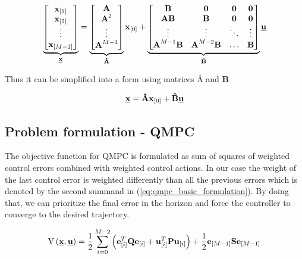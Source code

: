 \begin{equation}
\label{eq:prediction_big}
\underbrace{
\begin{bmatrix}
\textbf{x}_{[1]} \\
\textbf{x}_{[2]} \\
\vdots \\
\textbf{x}_{[M-1]} \\
\end{bmatrix}}_{\textbf{\underline{x}}}
=
\underbrace{
\begin{bmatrix}
\textbf{A} \\
\textbf{A}^2 \\
\vdots \\
\textbf{A}^{M-1} \\
\end{bmatrix}}_{\textbf{\^A}}
\textbf{x}_{[0]}
+
\underbrace{
\begin{bmatrix}
\textbf{B} & \textbf{0} & \textbf{0} & \textbf{0} \\
\textbf{AB} & \textbf{B} & \textbf{0} & \textbf{0} \\
\vdots & \vdots & \ddots & \vdots \\
\textbf{A}^{M-1}\textbf{B} & \textbf{A}^{M-2}\textbf{B} & \hdots & \textbf{B}
\end{bmatrix}
}_{\textbf{\^B}}\underline{\textbf{u}}
\end{equation}

Thus it can be simplified into a form using matrices $\textbf{\^A}$ and $\textbf{\^B}$

\begin{equation}
\textbf{\underline{x}} = \textbf{\^A}\textbf{x}_{[0]} + \textbf{\^B}\textbf{\underline{u}}
\label{eq:prediction_final}
\end{equation}

\subsection{Problem formulation - QMPC}


The objective function for QMPC is formulated as sum of squares of weighted control errors combined with weighted control actions. In our case the weight of the last control error is weighted differently than all the previous errors which is denoted by the second summand in (\ref{eq:qmpc_basic_formulation}). By doing that, we can prioritize the final error in the horizon and force the controller to converge to the desired trajectory.

\begin{equation}
\label{eq:qmpc_basic_formulation}
\mathrm{V}\left(\textbf{\underline{x}}, \textbf{\underline{u}}\right) = \frac{1}{2}\sum_{i=0}^{M-2}\left(\textbf{e}^T_{[i]}\textbf{Q}\textbf{e}_{[i]} + \textbf{u}^T_{[i]}\textbf{P}\textbf{u}_{[i]}\right) + \frac{1}{2}\textbf{e}_{[M-1]}\textbf{S}\textbf{e}_{[M-1]}
\end{equation}

